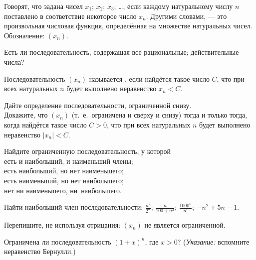 \documentclass[a4paper, 11pt]{article}
\begin{document}


 Говорят, что задана  чисел
$x_1$; $x_2$; $x_3$; \dots ,  если каждому натуральному
числу $n$ поставлено в соответствие некоторое число $x_n$.
Другими словами,  ---
это произвольная числовая
функция, определ\"енная на множестве натуральных чисел.
Обозначение: $(x_n)$.  

Есть ли последовательность, содержащая все  рациональные;  действительные числа?

 Последовательность $(x_n)$ называется ,
если найд\"ется такое число $C$, что при всех натуральных $n$
будет выполнено неравенство $x_n<C$.

 Дайте определение последовательности, ограниченной снизу.\\
 Докажите, что %
$(x_n)$ 
(т.~е.~ограничена и сверху и снизу) тогда и только тогда, когда
найд\"ется такое число $C>0$, что при всех натуральных $n$
будет выполнено неравенство $|x_n|<C$.


 Найдите ограниченную последовательность, у которой\\
  есть и наибольший, и наименьший члены;\\
  есть наибольший, но нет наименьшего;\\
  есть наименьший, но нет наибольшего;\\
  нет ни наименьшего, ни~\hbox{наибольшего.}


 Найти наибольший член последовательности:
 $\frac{n^2}{2^n}$;
 $\frac{n}{100+n^2}$;
 $\frac{1000^n}{n!}$;
 $-n^2+5n-1$.


Перепишите, не используя отрицания:
 $(x_n)$ не  является ограниченной.


Ограничена ли последовательность $(1+x)^n$, где $x>0$? ({\it Указание:} вспомните неравенство Бернулли.)
\end{document}
